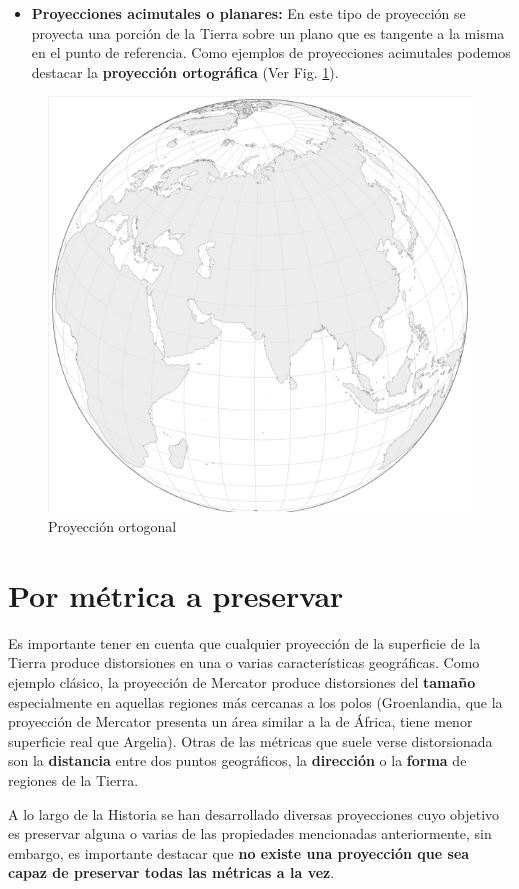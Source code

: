 \documentclass[
]{book}
\providecommand{\tightlist}{%
  \setlength{\itemsep}{0pt}\setlength{\parskip}{0pt}}
\theoremstyle{definition}
\theoremstyle{definition}
\theoremstyle{definition}
\theoremstyle{definition}
\theoremstyle{remark}
\begin{document}
\begin{itemize}
\tightlist
\item
  \textbf{Proyecciones acimutales o planares:} En este tipo de proyección se
  proyecta una porción de la Tierra sobre un plano que es tangente a la misma
  en el punto de referencia. Como ejemplos de proyecciones acimutales podemos
  destacar la \textbf{proyección ortográfica} (Ver Fig. \ref{fig:orto}).
\end{itemize}

\begin{figure}

{\centering \includegraphics[width=0.4\linewidth]{img/orto} 

}

\caption{Proyección ortogonal}\label{fig:orto}
\end{figure}

\hypertarget{por-muxe9trica-a-preservar}{%
\section{Por métrica a preservar}\label{por-muxe9trica-a-preservar}}

Es importante tener en cuenta que cualquier proyección de la superficie de la
Tierra produce distorsiones en una o varias características geográficas. Como
ejemplo clásico, la proyección de Mercator produce distorsiones del \textbf{tamaño}
especialmente en aquellas regiones más cercanas a los polos (Groenlandia, que la
proyección de Mercator presenta un área similar a la de África, tiene menor
superficie real que Argelia). Otras de las métricas que suele verse
distorsionada son la \textbf{distancia} entre dos puntos geográficos, la
\textbf{dirección} o la \textbf{forma} de regiones de la Tierra.

A lo largo de la Historia se han desarrollado diversas proyecciones cuyo
objetivo es preservar alguna o varias de las propiedades mencionadas
anteriormente, sin embargo, es importante destacar que \textbf{no existe una
proyección que sea capaz de preservar todas las métricas a la vez}.
\end{document}
